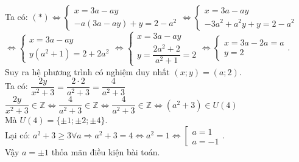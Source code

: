 \begin{ex}
{\begin{enumerate}[a)]
\begin{itemize}
			Ta có: $(*)\Leftrightarrow \begin{cases}
			x=3a-ay\\-a(3a-ay)+y=2-a^2
			\end{cases}
			\Leftrightarrow
			\begin{cases}
			x=3a-ay\\
			-3a^2+a^2y+y=2-a^2
			\end{cases}$\\
			$\Leftrightarrow \begin{cases}
			x=3a-ay\\y(a^2+1)=2+2a^2
			\end{cases}
			\Leftrightarrow
			\begin{cases}
			x=3a-ay\\
			y=\dfrac{2a^2+2}{a^2+1}=2
			\end{cases}
			\Leftrightarrow
			\begin{cases}
			x=3a-2a=a\\
			y=2
			\end{cases}$.\\
			Suy ra hệ phương trình có nghiệm duy nhất $(x;y)=(a;2)$.\\
			Ta có: $\dfrac{2y}{x^2+3}=\dfrac{2\cdot 2}{a^2+3}=\dfrac{4}{a^2+3}$\\
			$\dfrac{2y}{x^2+3}\in\mathbb{Z}\Leftrightarrow \dfrac{4}{a^2+3}\in\mathbb{Z}\Leftrightarrow \dfrac{4}{a^2+3}\in\mathbb{Z}\Leftrightarrow (a^2+3)\in U(4)$\\
			Mà $U(4)=\{\pm1;\pm2;\pm4\}$.\\
			Lại có: $a^2+3\geq3\forall a\Rightarrow a^2+3=4\Leftrightarrow a^2=1\Leftrightarrow \left[\begin{array}{c}a=1\\a=-1\end{array}\right.$.\\
			Vậy $a=\pm1$ thỏa mãn điều kiện bài toán.
		\end{itemize}
	\end{enumerate}}
\end{ex}


